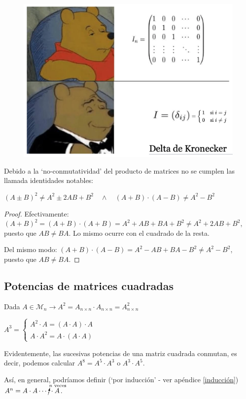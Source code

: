 	\begin{figure}[H]
		\centering
		\includegraphics[width=.8\textwidth]{imagenes/imagenes03/T03IM04.png}
	\end{figure}



\begin{coro}
Debido a la `no-conmutatividad' del producto de matrices no se cumplen las llamada identidades notables:

$(A\pm B)^2 \neq A^2 \pm 2 AB + B^2 \quad \wedge \quad (A+B)\cdot (A-B) \neq A^2 - B^2$
\end{coro}
\begin{proof}

Efectivamente: $(A+B)^2=(A+B)\cdot (A+B)=A^2+AB+BA+B^2 \neq A^2 +2AB+ B^2$, puesto que $AB\neq BA$. Lo mismo ocurre con el cuadrado de la resta.

Del	mismo modo: $(A+B)\cdot (A-B)=A^2-AB+BA-B^2 \neq A^2-B^2$, puesto que $AB\neq BA$.  
\end{proof}


\subsection{Potencias de matrices cuadradas}

\begin{defi}
Dada $A\in \mathcal M_n \to A^2=A_{n \times n} \cdot A_{n \times n} =A^2_{n \times n} $

$A^3= \begin{cases}A^2\cdot A=(A\cdot A )\cdot A  \\ A \cdot A^2 = A\cdot (A \cdot A)\end{cases}$	

Evidentemente, las sucesivas potencias de una matriz cuadrada conmutan, es decir, podemos calcular $A^8=A^5 \cdot A^3$ o $A^3\cdot A^5$.

\noindent \small{Así, en general, podríamos definir (`por inducción' - ver apéndice \ref{inducción})} $A^n=A\cdot A \cdots \cancelto{n \text{ veces }}{.}  \cdot A$\normalsize{.}
\end{defi}

